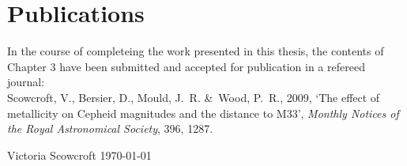 \chapter*{Publications}
In the course of completeing the work presented in this thesis, the contents of
Chapter 3 have been submitted and accepted for publication in a refereed journal:\\

Scowcroft, V., Bersier, D., Mould, J.~R. \&\ Wood, P.~R., 2009, `The effect of metallicity on Cepheid magnitudes and the distance to M33', \textit{Monthly Notices of the Royal Astronomical Society}, 396, 1287.


\vfill
{\sc Victoria Scowcroft  \hfill\today}

